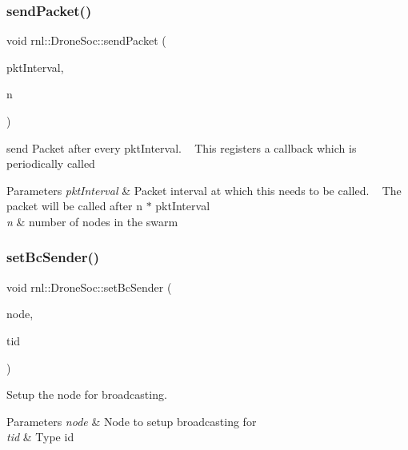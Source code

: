 \subsubsection{\texorpdfstring{send\+Packet()}{sendPacket()}}
{\footnotesize\ttfamily void rnl\+::\+Drone\+Soc\+::send\+Packet (\begin{DoxyParamCaption}\item[{ns3\+::\+Time}]{pkt\+Interval,  }\item[{int}]{n }\end{DoxyParamCaption})}



send Packet after every pkt\+Interval. ~\newline
 This registers a callback which is periodically called 


\begin{DoxyParams}{Parameters}
{\em pkt\+Interval} & Packet interval at which this needs to be called. ~\newline
The packet will be called after n $\ast$ pkt\+Interval\\
\hline
{\em n} & number of nodes in the swarm \\
\hline
\end{DoxyParams}
\mbox{\label{structrnl_1_1DroneSoc_ace69ee9fbd96e334a32fb5d499c70588}} 
\subsubsection{\texorpdfstring{set\+Bc\+Sender()}{setBcSender()}}
{\footnotesize\ttfamily void rnl\+::\+Drone\+Soc\+::set\+Bc\+Sender (\begin{DoxyParamCaption}\item[{ns3\+::\+Ptr$<$ ns3\+::\+Node $>$}]{node,  }\item[{ns3\+::\+Type\+Id}]{tid }\end{DoxyParamCaption})}



Setup the node for broadcasting. 


\begin{DoxyParams}{Parameters}
{\em node} & Node to setup broadcasting for \\
\hline
{\em tid} & Type id \\
\hline
\end{DoxyParams}
\mbox{\label{structrnl_1_1DroneSoc_a79565f4fa767a87e45e400e1ab0b03f8}} 
